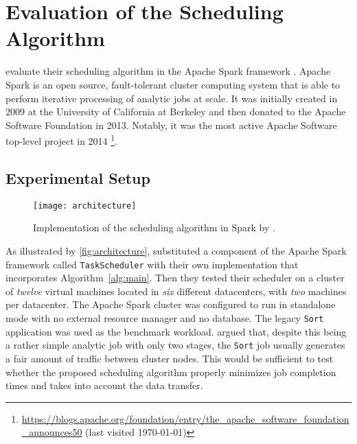 \section{Evaluation of the Scheduling Algorithm}

\citet{Chen2017} evaluate their scheduling algorithm in the Apache Spark framework \cite{Zaharia2012}. Apache Spark is an open source, fault-tolerant cluster computing system that is able to perform iterative processing of analytic jobs at scale. It was initially created in 2009 at the University of California at Berkeley and then donated to the Apache Software Foundation in 2013. Notably, it was the most active Apache Software top-level project in 2014 \footnote{\url{https://blogs.apache.org/foundation/entry/the_apache_software_foundation_announces50} (last visited \today)}.

\subsection{Experimental Setup}

\begin{figure}
  \centering
  \texttt{[image: architecture]} \\
  \caption{Implementation of the scheduling algorithm in Spark by \citet{Chen2017}.}
  \label{fig:architecture}
\end{figure}

As illustrated by \autoref{fig:architecture}, \citet{Chen2017} substituted a component of the Apache Spark framework called \texttt{TaskScheduler} with their own implementation that incorporates Algorithm~\ref{alg:main}. Then they tested their scheduler on a cluster of \emph{twelve} virtual machines located in \emph{six} different datacenters, with \emph{two} machines per datacenter. The Apache Spark cluster was configured to run in standalone mode with no external resource manager and no database. The legacy \texttt{Sort} application was used as the benchmark workload. \citet{Chen2017} argued that, despite this being a rather simple analytic job with only two stages, the \texttt{Sort} job usually generates a fair amount of traffic between cluster nodes. This would be sufficient to test whether the proposed scheduling algorithm properly minimizes job completion times and takes into account the data transfer.

